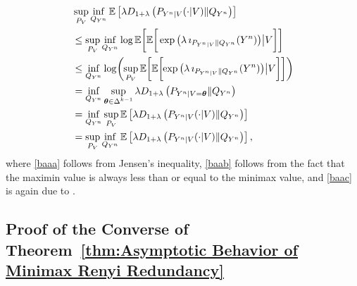 \documentclass[journal, 10pt]{IEEEtran}
\newcommand{\bbE}{\mathbb{E}}
\theoremstyle{plain}
\theoremstyle{plain}
\theoremstyle{plain}
\theoremstyle{plain}
\newcommand{\boldtheta}{\mathbold{\theta}}
\newcommand{\simplex}{\operatorname{\Delta}}
\begin{document}
\begin{align}
&\sup_{P_V}\inf_{Q_{Y^n}} \bbE \left[\lambda D_{1+\lambda}\left(P_{Y^n|V}(\cdot|V) \|Q_{Y^n}\right) \right] \nonumber \\
&\le \sup_{P_V} \inf_{Q_{Y^n} } \log \bbE\bigg[ \bbE \bigg[\exp\big( \lambda\, \imath_{P_{Y^n|V} \| Q_{Y^n} } (Y^n) \big)\big| V  \bigg]  \bigg] \label{baaa} \\
&\le \inf_{Q_{Y^n} } \log \hspace{-0.5mm} \bigg(\hspace{-0.8mm} \sup_{P_V} \bbE\bigg[ \bbE \bigg[\hspace{-0.8mm} \exp\big( \lambda\, \imath_{P_{Y^n|V} \| Q_{Y^n} } (Y^n) \big)\big| V  \bigg]  \bigg] \bigg) \label{baab} \\
&=\inf_{Q_{Y^n}} \sup_{\boldtheta \in \simplex^{k-1} } \lambda D_{1+\lambda}\left(P_{Y^n|V=\boldtheta} \| Q_{Y^n}\right)  \\
&=\inf_{Q_{Y^n}} \sup_{P_V} \bbE \left[\lambda D_{1+\lambda}\left(P_{Y^n|V}(\cdot|V) \|Q_{Y^n}\right) \right] \\
&=\sup_{P_V} \inf_{Q_{Y^n}} \bbE \left[\lambda D_{1+\lambda}\left(P_{Y^n|V}(\cdot|V) \|Q_{Y^n}\right) \right]\text{,} \label{baac}
\end{align}
where \eqref{baaa} follows from Jensen's inequality, \eqref{baab} follows from the fact that the maximin value is always less than or equal to the minimax value, and \eqref{baac} is again due to \cite[Theorem 34]{Erven2014}. \hfill \IEEEQED
\subsection{Proof of the Converse of Theorem~\ref{thm:Asymptotic Behavior of Minimax Renyi Redundancy} }\label{sec:converse}
\end{document}
